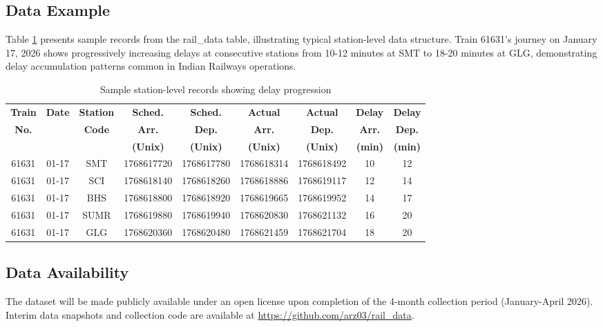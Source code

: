 \documentclass[conference]{IEEEtran}
\begin{document}
\subsection{Data Example}

Table \ref{tab:data_example} presents sample records from the rail\_data table, illustrating typical station-level data structure. Train 61631's journey on January 17, 2026 shows progressively increasing delays at consecutive stations from 10-12 minutes at SMT to 18-20 minutes at GLG, demonstrating delay accumulation patterns common in Indian Railways operations.

\begin{table}[t]
\centering
\caption{Sample station-level records showing delay progression}
\label{tab:data_example}
\small
\begin{tabular}{@{}ccccccccc@{}}
\toprule
\textbf{Train} & \textbf{Date} & \textbf{Station} & \textbf{Sched.} & \textbf{Sched.} & \textbf{Actual} & \textbf{Actual} & \textbf{Delay} & \textbf{Delay} \\
\textbf{No.} & & \textbf{Code} & \textbf{Arr.} & \textbf{Dep.} & \textbf{Arr.} & \textbf{Dep.} & \textbf{Arr.} & \textbf{Dep.} \\
& & & \textbf{(Unix)} & \textbf{(Unix)} & \textbf{(Unix)} & \textbf{(Unix)} & \textbf{(min)} & \textbf{(min)} \\
\midrule
61631 & 01-17 & SMT & 1768617720 & 1768617780 & 1768618314 & 1768618492 & 10 & 12 \\
61631 & 01-17 & SCI & 1768618140 & 1768618260 & 1768618886 & 1768619117 & 12 & 14 \\
61631 & 01-17 & BHS & 1768618800 & 1768618920 & 1768619665 & 1768619952 & 14 & 17 \\
61631 & 01-17 & SUMR & 1768619880 & 1768619940 & 1768620830 & 1768621132 & 16 & 20 \\
61631 & 01-17 & GLG & 1768620360 & 1768620480 & 1768621459 & 1768621704 & 18 & 20 \\
\bottomrule
\end{tabular}
\end{table}

\subsection{Data Availability}

The dataset will be made publicly available under an open license upon completion of the 4-month collection period (January-April 2026). Interim data snapshots and collection code are available at \url{https://github.com/arz03/rail_data}.
\end{document}
